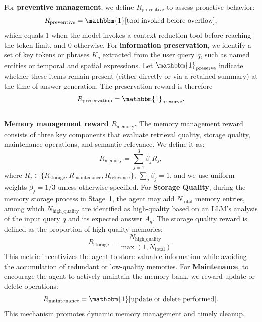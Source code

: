 For \textbf{preventive management}, we define $R_\text{preventive}$ to assess proactive behavior:
\begin{equation}
R_{\text{preventive}} = \mathbbm{1}[\text{tool invoked before overflow}],
\end{equation}
which equals 1 when the model invokes a context-reduction tool before reaching the token limit, and 0 otherwise.
For \textbf{information preservation}, we identify a set of key tokens or phrases $K_q$ extracted from the user query $q$, such as named entities or temporal and spatial expressions. Let $\mathbbm{1}_{\text{preserve}}$ indicate whether these items remain present (either directly or via a retained summary) at the time of answer generation. The preservation reward is therefore
\begin{equation}
R_{\text{preservation}}
= \mathbbm{1}_{\text{preserve}}.
\end{equation}
\\
\textbf{Memory management reward $R_{\text{memory}}$.}
The memory management reward consists of three key components that evaluate retrieval quality, storage quality, maintenance operations, and semantic relevance. We define it as:
\begin{equation}
R_{\text{memory}} = \sum_{j=1}^{3} \beta_j R_j,
\end{equation}
where $R_j \in \{R_{\text{storage}}, R_{\text{maintenance}}, R_{\text{relevance}}\}$, $\sum_j \beta_j = 1$, and we use uniform weights $\beta_j = 1/3$ unless otherwise specified.
For \textbf{Storage Quality}, during the memory storage process in Stage~1, the agent may add $N_{\text{total}}$ memory entries, among which $N_{\text{high\_quality}}$ are identified as high-quality based on an LLM’s analysis of the input query $q$ and its expected answer $A_q$. The storage quality reward is defined as the proportion of high-quality memories:
\begin{equation}
R_{\text{storage}} = \frac{N_{\text{high\_quality}}}{\max(1, N_{\text{total}})}.
\end{equation}
This metric incentivizes the agent to store valuable information while avoiding the accumulation of redundant or low-quality memories.
For \textbf{Maintenance}, to encourage the agent to actively maintain the memory bank, we reward update or delete operations:
\begin{equation}
R_{\text{maintenance}} = \mathbbm{1}[\text{update or delete performed}].
\end{equation}
This mechanism promotes dynamic memory management and timely cleanup.
